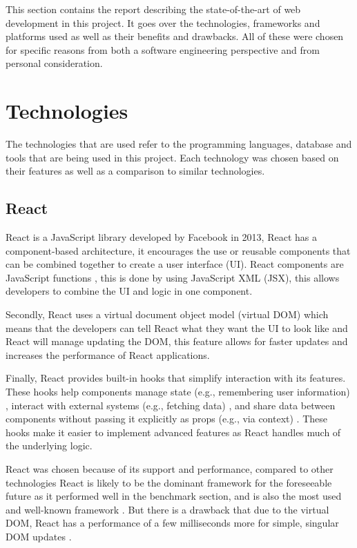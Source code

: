 \documentclass[]{project_report}
\begin{document}
This section contains the report describing the state-of-the-art of web development in this project. It goes over the technologies, frameworks and platforms used as well as their benefits and drawbacks. All of these were chosen for specific reasons from both a software engineering perspective and from personal consideration.


\section{Technologies}

The technologies that are used refer to the programming languages, database and tools that are being used in this project. Each technology was chosen based on their features as well as a comparison to similar technologies.

\subsection{React}

React is a JavaScript library developed by Facebook in 2013, React has a component-based architecture, it encourages the use or reusable components that can be combined together to create a user interface (UI). React components are JavaScript functions \cite{react}, this is done by using JavaScript XML (JSX), this allows developers to combine the UI and logic in one component. 

Secondly, React uses a virtual document object model (virtual DOM) which means that the developers can tell React what they want the UI to look like and React will manage updating the DOM, this feature allows for faster updates and increases the performance of React applications. 

Finally, React provides built-in hooks that simplify interaction with its features. These hooks help components manage state (e.g., remembering user information) \cite{react_hooks}, interact with external systems (e.g., fetching data) \cite{react_hooks}, and share data between components without passing it explicitly as props (e.g., via context) \cite{react_hooks}. These hooks make it easier to implement advanced features as React handles much of the underlying logic.

React was chosen because of its support and performance, compared to other technologies React is likely to be the dominant framework for the foreseeable future \cite{frontend_framework_comparison} as it performed well in the benchmark section, and is also the most used and well-known framework \cite{frontend_framework_comparison}. But there is a drawback that due to the virtual DOM, React has a performance of a few milliseconds more for simple, singular DOM updates \cite{frontend_framework_comparison}.
\end{document}
